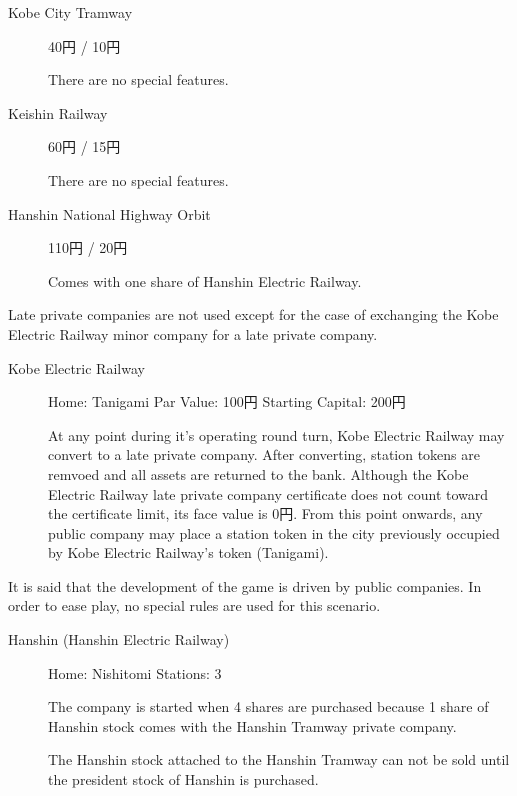 \begin{multicols}{2}
\begin{description}
\item[Kobe City Tramway] 40円 / 10円

  There are no special features.

\item[Keishin Railway]  60円 / 15円

  There are no special features.

\item[Hanshin National Highway Orbit] 110円 / 20円

  Comes with one share of Hanshin Electric Railway.
\end{description}


Late private companies are not used except for the case of exchanging
the Kobe Electric Railway minor company for a late private company.

\begin{description}
\item[Kobe Electric Railway] \hfill

  Home: Tanigami \hfill Par Value: 100円  \hfill Starting Capital: 200円

  At any point during it's operating round turn, Kobe Electric Railway
  may convert to a late private company. After converting, station
  tokens are remvoed and all assets are returned to the bank. Although
  the Kobe Electric Railway late private company certificate does not
  count toward the certificate limit, its face value is 0円. From
  this point onwards, any public company may place a station token in
  the city previously occupied by Kobe Electric Railway's token
  (Tanigami).

\end{description}

It is said that the development of the game is driven by public
companies. In order to ease play, no special rules are used for this
scenario.
\begin{description}
\item[Hanshin (Hanshin Electric Railway)] \hfill

  Home: Nishitomi \hfill Stations: 3

  The company is started when 4 shares are purchased because 1 share
  of Hanshin stock comes with the Hanshin Tramway private company.

  The Hanshin stock attached to the Hanshin Tramway can not be sold
  until the president stock of Hanshin is purchased.


\end{description}
\end{multicols}
